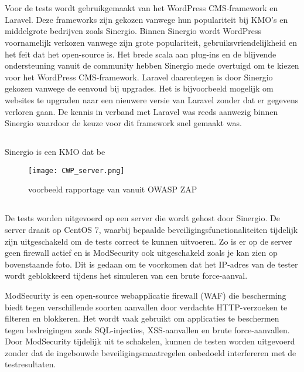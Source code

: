 \section{}
Voor de tests wordt gebruikgemaakt van het WordPress CMS-framework en Laravel. Deze frameworks zijn gekozen vanwege hun 
populariteit bij KMO's en middelgrote bedrijven zoals Sinergio. Binnen Sinergio wordt WordPress voornamelijk verkozen vanwege 
zijn grote populariteit, gebruiksvriendelijkheid en het feit dat het open-source is. Het brede scala aan plug-ins en de 
blijvende ondersteuning vanuit de community hebben Sinergio mede overtuigd om te kiezen voor het WordPress CMS-framework. 
Laravel daarentegen is door Sinergio gekozen vanwege de eenvoud bij upgrades. Het is bijvoorbeeld mogelijk om websites 
te upgraden naar een nieuwere versie van Laravel zonder dat er gegevens verloren gaan. De kennis in verband met Laravel was 
reeds aanwezig binnen Sinergio waardoor de keuze voor dit framework snel gemaakt was.

\subsection{}
Sinergio is een KMO dat be

\begin{figure}
    \centering
    \texttt{[image: CWP\_server.png]}
    \caption[voorbeeld rapportage van vanuit OWASP ZAP]{voorbeeld rapportage van vanuit OWASP ZAP}
\end{figure}
\subsection{}
De tests worden uitgevoerd op een server die wordt gehost door Sinergio. De server draait op CentOS 7, waarbij bepaalde 
beveiligingsfunctionaliteiten tijdelijk zijn uitgeschakeld om de tests correct te kunnen uitvoeren. Zo is er op de server 
geen firewall actief en is ModSecurity ook uitgeschakeld zoals je kan zien op bovenstaande foto. Dit is gedaan om te voorkomen dat het IP-adres van de tester wordt 
geblokkeerd tijdens het simuleren van een brute force-aanval.

ModSecurity is een open-source webapplicatie firewall (WAF) die bescherming biedt tegen verschillende soorten aanvallen door 
verdachte HTTP-verzoeken te filteren en blokkeren. Het wordt vaak gebruikt om applicaties te beschermen tegen bedreigingen 
zoals SQL-injecties, XSS-aanvallen en brute force-aanvallen. Door ModSecurity tijdelijk uit te schakelen, kunnen de testen 
worden uitgevoerd zonder dat de ingebouwde beveiligingsmaatregelen onbedoeld interfereren met de testresultaten.

